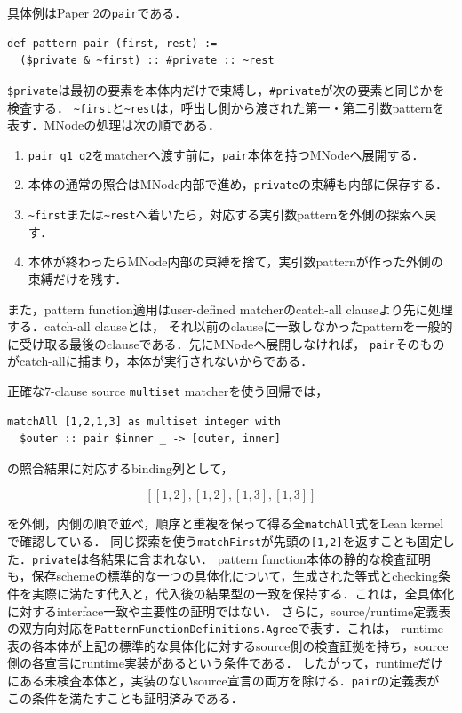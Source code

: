 \documentclass[11pt,a4paper,oneside]{ltjsbook}
\newcommand{\code}[1]{\texttt{#1}}
\begin{document}
具体例はPaper 2の\code{pair}である．

\begin{lstlisting}
def pattern pair (first, rest) :=
  ($private & ~first) :: #private :: ~rest
\end{lstlisting}

\code{\$private}は最初の要素を本体内だけで束縛し，\code{\#private}が次の要素と同じかを検査する．
\code{\textasciitilde first}と\code{\textasciitilde rest}は，呼出し側から渡された第一・第二引数patternを表す．MNodeの処理は次の順である．

\begin{enumerate}[leftmargin=2em]
  \item \code{pair q1 q2}をmatcherへ渡す前に，\code{pair}本体を持つMNodeへ展開する．
  \item 本体の通常の照合はMNode内部で進め，\code{private}の束縛も内部に保存する．
  \item \code{\textasciitilde first}または\code{\textasciitilde rest}へ着いたら，対応する実引数patternを外側の探索へ戻す．
  \item 本体が終わったらMNode内部の束縛を捨て，実引数patternが作った外側の束縛だけを残す．
\end{enumerate}

また，pattern function適用はuser-defined matcherのcatch-all clauseより先に処理する．catch-all clauseとは，
それ以前のclauseに一致しなかったpatternを一般的に受け取る最後のclauseである．先にMNodeへ展開しなければ，
\code{pair}そのものがcatch-allに捕まり，本体が実行されないからである．

正確な7-clause source \code{multiset} matcherを使う回帰では，

\begin{lstlisting}
matchAll [1,2,1,3] as multiset integer with
  $outer :: pair $inner _ -> [outer, inner]
\end{lstlisting}

の照合結果に対応するbinding列として，

\[
 [[1,2],[1,2],[1,3],[1,3]]
\]

を外側，内側の順で並べ，順序と重複を保って得る全\code{matchAll}式をLean kernelで確認している．
同じ探索を使う\code{matchFirst}が先頭の\code{[1,2]}を返すことも固定した．\code{private}は各結果に含まれない．
pattern function本体の静的な検査証明も，保存schemeの標準的な一つの具体化について，生成された等式とchecking条件を実際に満たす代入と，代入後の結果型の一致を保持する．これは，全具体化に対するinterface一致や主要性の証明ではない．
さらに，source/runtime定義表の双方向対応を\code{PatternFunctionDefinitions.Agree}で表す．これは，
runtime表の各本体が上記の標準的な具体化に対するsource側の検査証拠を持ち，source側の各宣言にruntime実装があるという条件である．
したがって，runtimeだけにある未検査本体と，実装のないsource宣言の両方を除ける．\code{pair}の定義表が
この条件を満たすことも証明済みである．
\end{document}
